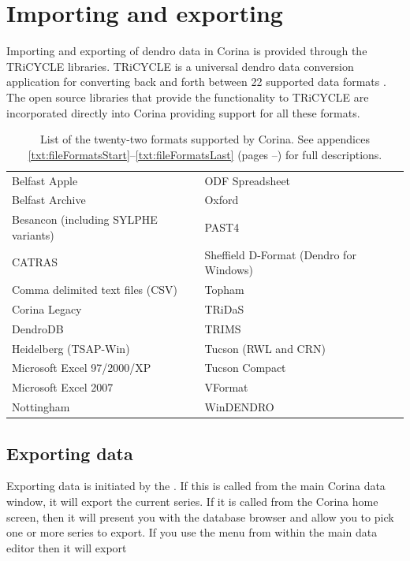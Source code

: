 \chapter{Importing and exporting}
\label{txt:importExport}
Importing and exporting of dendro data in Corina is provided through the TRiCYCLE libraries.  TRiCYCLE is a universal dendro data conversion application for converting back and forth between 22 supported data formats \citep{tricycle}.  The open source libraries that provide the functionality to TRiCYCLE are incorporated directly into Corina providing support for all these formats.  

\begin{table}[htbp]
\centering
\label{txt:formatList}
\begin{tabular*}{0.8\textwidth}{ll}
\toprule
Belfast Apple & ODF Spreadsheet \\
Belfast Archive & Oxford \\
Besancon (including SYLPHE variants) &   PAST4\\
CATRAS & Sheffield D-Format (Dendro for Windows)\\
Comma delimited text files (CSV) &  Topham \\
Corina Legacy &  TRiDaS\\
DendroDB & TRIMS\\
Heidelberg (TSAP-Win) &  Tucson (RWL and CRN)\\
Microsoft Excel 97/2000/XP& Tucson Compact\\
Microsoft Excel 2007 & VFormat\\
Nottingham &  WinDENDRO\\
\bottomrule
\end{tabular*}
\caption{List of the twenty-two formats supported by Corina. See appendices \ref{txt:fileFormatsStart}--\ref{txt:fileFormatsLast} (pages \pageref{txt:fileFormatsStart}--\pageref{txt:fileFormatsEnd}) for full descriptions.}
\end{table}



\section{Exporting data}
Exporting data is initiated by the .  If this is called from the main Corina data window, it will export the current series.  If it is called from the Corina home screen, then it will present you with the database browser and allow you to pick one or more series to export.  If you use the menu from within the main data editor then it will export 

